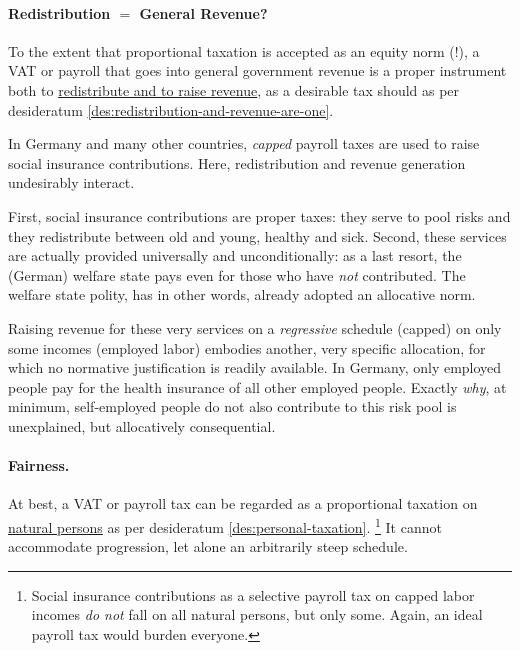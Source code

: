 \paragraph{Redistribution $=$ General Revenue?}
To the extent that proportional taxation is accepted as an equity norm (!), a VAT or payroll that goes into general government revenue is a proper instrument both to \hyperref[des:redistribution-and-revenue-are-one]{redistribute and to raise revenue}, as a desirable tax should as per desideratum \ref{des:redistribution-and-revenue-are-one}.

In Germany and many other countries, \emph{capped} payroll taxes are used to raise social insurance contributions.
Here, redistribution and revenue generation undesirably interact.

First, social insurance contributions are proper taxes:
they serve to pool risks and they redistribute between old and young, healthy and sick.
Second, these services are actually provided universally and unconditionally:
as a last resort, the (German) welfare state pays even for those who have \emph{not} contributed.
The welfare state polity, has in other words, already adopted an allocative norm.

Raising revenue for these very services on a \emph{regressive} schedule (capped) on only some incomes (employed labor) embodies another, very specific allocation, for which no normative justification is readily available.
In Germany, only employed people pay for the health insurance of all other employed people.
Exactly \emph{why}, at minimum, self-employed people do not also contribute to this risk pool is unexplained, but allocatively consequential.

\paragraph{Fairness.} At best, a VAT or payroll tax can be regarded as a proportional taxation on \hyperref[des:personal-taxation]{natural persons} as per desideratum \ref{des:personal-taxation}.
\footnote{
	Social insurance contributions as a selective payroll tax on capped labor incomes \emph{do not} fall on all natural persons, but only some.
	Again, an ideal payroll tax would burden everyone.
}
It cannot accommodate progression, let alone an arbitrarily steep schedule.

